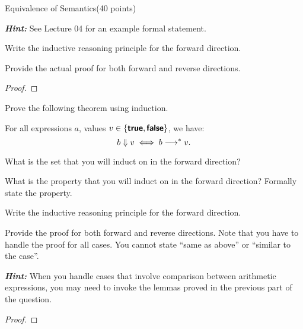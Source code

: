 \documentclass{article}
\begin{document}
\begin{question}{Equivalence of Semantics}{(40 points)}
\begin{subquestion}
\begin{subsubquestion}
      \medskip
      \textit{\textbf{Hint:}} See Lecture 04 for an example formal statement.
    \end{subsubquestion}

    \begin{subsubquestion}
      Write the inductive reasoning principle for the forward direction.
    \end{subsubquestion}

    \begin{subsubquestion}
      Provide the actual proof for both forward and reverse directions.
      \begin{proof}
      \end{proof}
    \end{subsubquestion}
    
  \end{subquestion}

  \begin{subquestion} Prove the following theorem using induction.
\begin{theorem*} For all expressions $a$,
values $v \in \{\mbox{\rm\textsf{\textbf{true}}}, \mbox{\rm\textsf{\textbf{false}}} \}$, we have:
\[ b \Downarrow v \iff b \longrightarrow^* v   .\]
\end{theorem*}
      \begin{subsubquestion}
      What is the set that you will induct on in the forward direction?
      \end{subsubquestion}

    \begin{subsubquestion}
      What is the property that you will induct on in the forward direction? Formally state the property.
      
    \end{subsubquestion}

    \begin{subsubquestion}
      Write the inductive reasoning principle for the forward direction.
    \end{subsubquestion}

    \begin{subsubquestion}
      Provide the  proof for both forward and reverse directions. Note that you have to handle the proof for all cases.
      You cannot state ``same as above'' or ``similar to the case''.

      \medskip
      \textit{\textbf{Hint:}} When you handle cases that involve comparison between arithmetic expressions, you may need to invoke the lemmas proved in the previous part of the question.
    \begin{proof}
    \end{proof}
    \end{subsubquestion}

\end{subquestion}
  
\begin{answer}{}
\end{answer}

\end{question}
\end{document}

